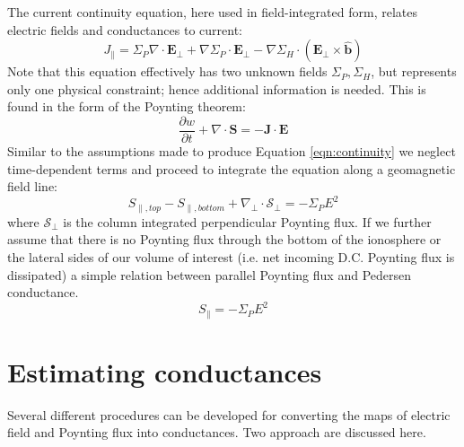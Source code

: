 \documentclass[11pt,letterpaper]{article}
\begin{document}
The current continuity equation, here used in field-integrated form, relates electric fields and conductances to current:
\begin{equation}
\boxed{
J_\parallel = \Sigma_P \nabla \cdot \mathbf{E}_\perp + \nabla \Sigma_P \cdot \mathbf{E}_\perp - \nabla \Sigma_H \cdot \left( \mathbf{E}_\perp \times \hat{\mathbf{b}} \right)
} \label{eqn:continuity}
\end{equation}
Note that this equation effectively has two unknown fields $\Sigma_P,\Sigma_H$, but represents only one physical constraint; hence additional information is needed.  This is found in the form of the Poynting theorem:
\begin{equation}
\frac{\partial w}{\partial t} + \nabla \cdot \mathbf{S} = - \mathbf{J} \cdot \mathbf{E}
\end{equation}
Similar to the assumptions made to produce Equation \ref{eqn:continuity} we neglect time-dependent terms and proceed to integrate the equation along a geomagnetic field line:
\begin{equation}
S_{\parallel,top} - S_{\parallel,bottom} + \nabla_\perp \cdot \mathbf{\mathcal{S}}_\perp = - \Sigma_P E^2
\end{equation}
where $\mathbf{\mathcal{S}}_\perp$ is the column integrated perpendicular Poynting flux.  If we further assume that there is no Poynting flux through the bottom of the ionosphere or the lateral sides of our volume of interest (i.e. net incoming D.C. Poynting flux is dissipated) a simple relation between parallel Poynting flux and Pedersen conductance.  
\begin{equation}
\boxed{
S_{\parallel}  = - \Sigma_P E^2
} \label{eqn:poynting}
\end{equation}


\section{Estimating conductances}

Several different procedures can be developed for converting the maps of electric field and Poynting flux into conductances. Two approach are discussed here.   
\end{document}
